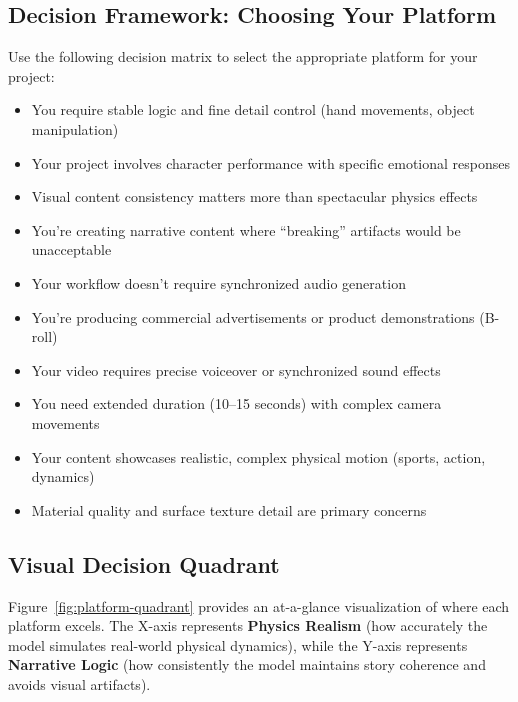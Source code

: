 \subsection{Decision Framework: Choosing Your Platform}

Use the following decision matrix to select the appropriate platform for your project:

\begin{promptbox}
\begin{itemize}
    \item You require stable logic and fine detail control (hand movements, object manipulation)
    \item Your project involves character performance with specific emotional responses
    \item Visual content consistency matters more than spectacular physics effects
    \item You're creating narrative content where ``breaking'' artifacts would be unacceptable
    \item Your workflow doesn't require synchronized audio generation
\end{itemize}
\end{promptbox}

\begin{orangebox}
\begin{itemize}
    \item You're producing commercial advertisements or product demonstrations (B-roll)
    \item Your video requires precise voiceover or synchronized sound effects
    \item You need extended duration (10--15 seconds) with complex camera movements
    \item Your content showcases realistic, complex physical motion (sports, action, dynamics)
    \item Material quality and surface texture detail are primary concerns
\end{itemize}
\end{orangebox}

\subsection{Visual Decision Quadrant}

Figure~\ref{fig:platform-quadrant} provides an at-a-glance visualization of where each platform excels. The X-axis represents \textbf{Physics Realism} (how accurately the model simulates real-world physical dynamics), while the Y-axis represents \textbf{Narrative Logic} (how consistently the model maintains story coherence and avoids visual artifacts).


